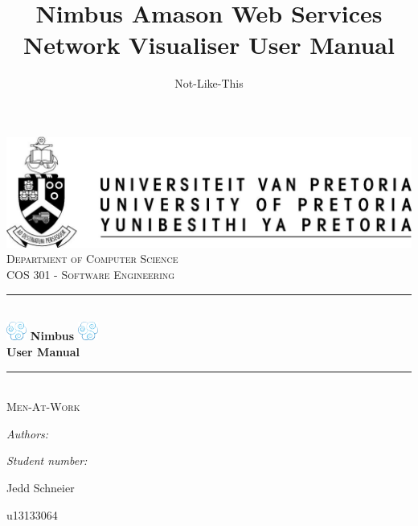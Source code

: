 \documentclass[hidelinks,a4paper,12pt]{article}
\author{Not-Like-This}
\title{ Nimbus Amason Web Services Network Visualiser User Manual}
\newcommand{\HRule}{\rule{\linewidth}{0.5mm}}
\begin{document}
\setlength{\parskip}{6pt}

\begin{titlepage}

\begin{center}
\includegraphics[width=1\textwidth]{./images/up-logo.jpg}\\[0.4cm]    
\textsc{\LARGE Department of Computer Science}\\[1.5cm]
\textsc{\Large COS 301 - Software Engineering}\\[0.5cm]
\HRule \\[0.4cm]
\includegraphics[width=0.05\textwidth]{./images/logo.png}
{ \huge \bfseries Nimbus}
\includegraphics[width=0.05\textwidth]{./images/logo.png}\\[0.4cm]   
{ \huge \bfseries User Manual}\\[0.4cm]
\HRule \\[0.4cm]
\textsc{\Large Men-At-Work}\\[0.5cm]
\begin{minipage}{0.4\textwidth}
\begin{flushleft} \large
\emph{Authors:}
\end{flushleft}
\end{minipage}
\begin{minipage}{0.4\textwidth}
\begin{flushright} \large
\emph{Student number:}
\end{flushright}
\end{minipage}

\begin{minipage}{0.4\textwidth}
\begin{flushleft} \large
Jedd {Schneier}
\end{flushleft}
\end{minipage}
\begin{minipage}{0.4\textwidth}
\begin{flushright} \large
\emph{}
u13133064
\end{flushright}
\end{minipage}


\end{center}
\end{titlepage}
\end{document}

